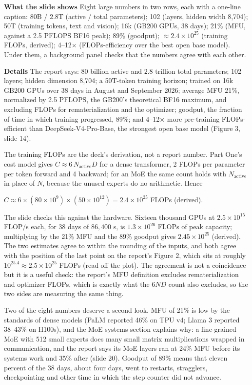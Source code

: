 \documentclass[11pt,letterpaper]{article}
\newcommand{\para}[1]{\medskip\noindent\textbf{#1}\quad}
\newenvironment{formulas}{\begin{tcolorbox}[formulabox]}{\end{tcolorbox}}
\newcommand{\Nact}{N_{\mathrm{active}}}
\begin{document}
\para{What the slide shows} Eight large numbers in two rows, each with a one-line caption: 80B / 2.8T (active / total parameters); 102 (layers, hidden width 8,704); 50T (training tokens, text and vision); 16k (GB200 GPUs, 38 days); 21\% (MFU, against a 2.5 PFLOPS BF16 peak); 89\% (goodput); $\approx2.4\times10^{25}$ (training FLOPs, derived); 4--12$\times$ (FLOPs-efficiency over the best open base model). Under them, a background panel checks that the numbers agree with each other.

\para{Details} The report says: 80 billion active and 2.8 trillion total parameters; 102 layers; hidden dimension 8,704; a 50T-token training horizon; trained on 16k GB200 GPUs over 38 days in August and September 2026; average MFU 21\%, normalized by 2.5 PFLOPS, the GB200's theoretical BF16 maximum, and excluding FLOPs for rematerialization and the optimizer; goodput, the fraction of time in which training progressed, 89\%; and 4--12$\times$ more pre-training FLOPs-efficient than DeepSeek-V4-Pro-Base, the strongest open base model (Figure 3, slide 14).

The training FLOPs are the deck's derivation, not a report number. Part One's cost model gives $C\approx6\,\Nact D$ for a dense transformer, 2 FLOPs per parameter per token forward and 4 backward; for an MoE the same count holds with $\Nact$ in place of $N$, because the unused experts do no arithmetic. Hence
\begin{formulas}
$C\approx6\times(80\times10^{9})\times(50\times10^{12})=2.4\times10^{25}$ FLOPs (derived).
\end{formulas}
The slide checks this against the hardware. Sixteen thousand GPUs at $2.5\times10^{15}$ FLOP/s each, for 38 days of $86{,}400$ s, is $1.3\times10^{26}$ FLOPs of peak capacity; multiplying by the 21\% MFU and the 89\% goodput gives $2.45\times10^{25}$ (derived). The two estimates agree to within the rounding of the inputs, and both agree with the position of the last point on the report's Figure 2, which sits at roughly $10^{25.4}\approx2.5\times10^{25}$ FLOPs (read off the plot). The agreement is not a coincidence but it is a useful check: the report's MFU definition excludes rematerialization and optimizer FLOPs, which is exactly what the $6ND$ count also excludes, so the two sides are measuring the same thing.

Two of the eight numbers deserve a second look. MFU of 21\% is low by the standards of dense models (PaLM reported 46\% on TPU v4; Llama 3 reported 38--43\% on H100s), and the MoE systems section explains why: a fine-grained MoE with 512 small experts does many small matrix multiplications wrapped in communication, and the report says its MoE layers ran at 24\% MFU before its systems work and 35\% after (slide 20). Goodput of 89\% means that eleven percent of the 38 days, about four days, went to restarts, stragglers, checkpointing and other time in which the step counter did not advance.
\end{document}
